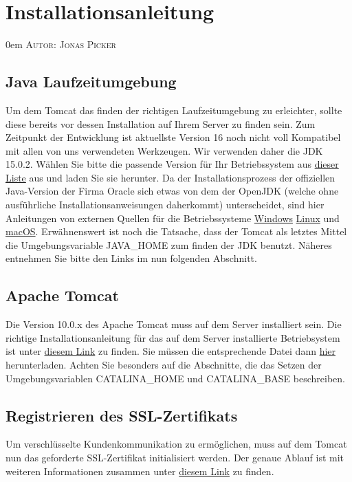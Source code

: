 \documentclass{article}
\makeatletter
\newcommand{\sectionauthor}[1]{
	{\parindent 0em \large \scshape Autor: #1 \par \nobreak \vspace*{1em}}
	\@afterheading
}
\makeatother
\begin{document}
\section{Installationsanleitung}
\sectionauthor{Jonas Picker}
\subsection{Java Laufzeitumgebung}
Um dem Tomcat das finden der richtigen Laufzeitumgebung zu erleichter, sollte diese bereits vor dessen Installation auf Ihrem Server zu finden sein. Zum Zeitpunkt der Entwicklung ist aktuellste Version 16 noch nicht voll Kompatibel mit allen von uns verwendeten Werkzeugen. Wir verwenden daher die JDK 15.0.2. Wählen Sie bitte die passende Version für Ihr Betriebssystem aus \href{https://jdk.java.net/archive/}{dieser Liste} aus und laden Sie sie herunter. Da der Installationsprozess der offiziellen Java-Version der Firma Oracle sich etwas von dem der OpenJDK (welche ohne ausführliche Installationsanweisungen daherkommt) unterscheidet, sind hier Anleitungen von externen Quellen für die Betriebssysteme \href{https://www.codejava.net/java-se/download-and-install-openjdk-15}{Windows} \href{https://www.linuxfromscratch.org/blfs/view/svn/general/openjdk.html}{Linux} und \href{https://mkyong.com/java/how-to-install-java-on-mac-osx/}{macOS}. Erwähnenswert ist noch die Tatsache, dass der Tomcat als letztes Mittel die Umgebungsvariable JAVA\_HOME zum finden der JDK benutzt. Näheres entnehmen Sie bitte den Links im nun folgenden Abschnitt.
\subsection{Apache Tomcat}
Die Version 10.0.x des Apache Tomcat muss auf dem Server installiert sein. Die richtige Installationsanleitung für das auf dem Server installierte Betriebsystem ist unter \href{https://tomcat.apache.org/tomcat-10.0-doc/setup.html}{diesem Link} zu finden. Sie müssen die entsprechende Datei dann \href{https://tomcat.apache.org/download-10.cgi}{hier} herunterladen. Achten Sie besonders auf die Abschnitte, die das Setzen der Umgebungsvariablen CATALINA\_HOME und CATALINA\_BASE beschreiben.
\subsection{Registrieren des SSL-Zertifikats}
Um verschlüsselte Kundenkommunikation zu ermöglichen, muss auf dem Tomcat nun das geforderte SSL-Zertifikat initialisiert werden. Der genaue Ablauf ist mit weiteren Informationen zusammen unter \href{https://tomcat.apache.org/tomcat-10.0-doc/ssl-howto.html#Introduction_to_SSL}{diesem Link} zu finden.
\end{document}
